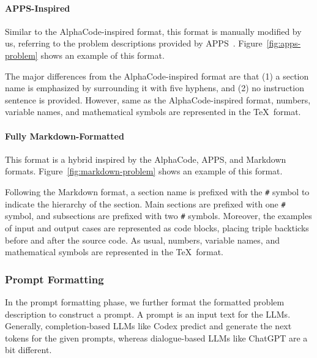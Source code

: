 \documentclass{article}
\begin{document}
\paragraph{APPS-Inspired}

Similar to the AlphaCode-inspired format, this format is manually modified by us, referring to the problem descriptions provided by APPS~\citep{hendrycks2021apps}.
Figure~\ref{fig:apps-problem} shows an example of this format.

The major differences from the AlphaCode-inspired format are that (1) a section name is emphasized by surrounding it with five hyphens, and (2) no instruction sentence is provided.
However, same as the AlphaCode-inspired format, numbers, variable names, and mathematical symbols are represented in the \TeX\, format.



\paragraph{Fully Markdown-Formatted}

This format is a hybrid inspired by the AlphaCode, APPS, and Markdown formats.
Figure~\ref{fig:markdown-problem} shows an example of this format.

Following the Markdown format, a section name is prefixed with the \texttt{\#} symbol to indicate the hierarchy of the section.
Main sections are prefixed with one \texttt{\#} symbol, and subsections are prefixed with two \texttt{\#} symbols.
Moreover, the examples of input and output cases are represented as code blocks, placing triple backticks \texttt{\textasciigrave\textasciigrave\textasciigrave} before and after the source code.
As usual, numbers, variable names, and mathematical symbols are represented in the \TeX\, format.






\subsubsection{Prompt Formatting}
\label{sec:experiments:formatting:prompt}

In the prompt formatting phase, we further format the formatted problem description to construct a prompt.
A prompt is an input text for the LLMs. Generally, completion-based LLMs like Codex predict and generate the next tokens for the given prompts, whereas dialogue-based LLMs like ChatGPT are a bit different. 
\end{document}
